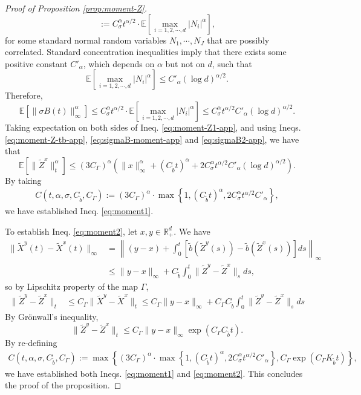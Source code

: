 \documentclass[11pt]{article}
\theoremstyle{definition}
\theoremstyle{plain}
\newcommand{\R}{\mathbb{R}}
\newcommand{\E}{\mathbb{E}}
\newcommand{\tb}{\tilde{b}}
\begin{document}
\begin{appendices}
\begin{proof}[Proof of Proposition \ref{prop:moment-Z}]
\[:= C_\sigma^\alpha t^{\alpha/2} \cdot \E\left[\max_{i=1, 2, \cdots, d} |N_i|^{\alpha}\right], 
\]
for some standard normal random variables $N_1, \cdots, N_J$ that are possibly correlated. 
Standard concentration inequalities imply that there exists some positive constant $C'_\alpha$, which depends on $\alpha$ but not on $d$, 
such that 
\[
\E\left[\max_{i=1, 2, \cdots, d} |N_i|^{\alpha}\right] \leq C'_\alpha \left(\log d\right)^{\alpha/2}.
\]
Therefore, 
\begin{equation}\label{eq:sigmaB2-app}
\E\left[\|\sigma B(t)\|^\alpha_\infty\right] \leq C_\sigma^\alpha t^{\alpha/2} \cdot \E\left[\max_{i=1, 2, \cdots, d} |N_i|^{\alpha}\right] 
\leq C_\sigma^\alpha t^{\alpha/2} C'_\alpha \left(\log d\right)^{\alpha/2}.
\end{equation}
Taking expectation on both sides of Ineq. \eqref{eq:moment-Z1-app}, and using Ineqs. \eqref{eq:moment-Z-tb-app}, \eqref{eq:sigmaB-moment-app} and \eqref{eq:sigmaB2-app}, 
we have that 
\begin{equation}
\E\left[\| \tilde{Z}^x \|_t^\alpha\right] \leq (3 C_{\Gamma})^\alpha \left( \|x\|^\alpha_\infty + \left(C_{\tb} t\right)^\alpha + 2 C_\sigma^\alpha t^{\alpha/2} C'_\alpha \left(\log d\right)^{\alpha/2}\right).
\end{equation}
By taking 
\begin{align}
C(t, \alpha, \sigma, C_{\tb}, C_{\Gamma}) 
:= (3 C_{\Gamma})^\alpha \cdot \max \left\{ 1, (C_{\tb} t)^\alpha, 2 C_\sigma^\alpha t^{\alpha/2} C'_\alpha \right\},
\end{align}
we have established Ineq. \eqref{eq:moment1}. 

To establish Ineq. \eqref{eq:moment2}, let $x, y \in \R_+^d$. We have
\begin{align*}
\|\tilde{X}^y(t) - \tilde{X}^x(t)\|_\infty &= \left\| (y - x) + \int_0^t \left[ \tb(\tilde{Z}^y(s)) - \tb(\tilde{Z}^x(s)) \right] ds\right\|_\infty \\
&\leq \|y - x\|_\infty + C_{\tb} \int_0^t \| \tilde{Z}^y - \tilde{Z}^x \|_s ds, 
\end{align*}
so by Lipschitz property of the map $\Gamma$, 
\begin{align*}
\| \tilde{Z}^y - \tilde{Z}^x \|_t &\leq C_{\Gamma} \| \tilde{X}^y - \tilde{X}^x \|_t \leq C_\Gamma \|y - x\|_\infty + C_\Gamma C_{\tb} \int_0^t \| \tilde{Z}^y - \tilde{Z}^x \|_s ds
\end{align*}
By Grönwall's inequality, 
\begin{equation*}
\| \tilde{Z}^y - \tilde{Z}^x \|_t \leq C_\Gamma \|y - x\|_\infty \exp(C_\Gamma C_{\tb} t). 
\end{equation*}
By re-defining
\begin{align}
C(t, \alpha, \sigma, C_{\tb}, C_{\Gamma}) 
:= \max\left\{(3 C_{\Gamma})^\alpha \cdot \max \left\{ 1, (C_{\tb} t)^\alpha, 2 C_\sigma^\alpha t^{\alpha/2} C'_\alpha \right\}, 
C_\Gamma  \exp(C_\Gamma K_{\tb} t)\right\},
\end{align}
we have established both Ineqs. \eqref{eq:moment1} and \eqref{eq:moment2}. 
This concludes the proof of the proposition. 
\end{proof}


\end{appendices}
\end{document}
